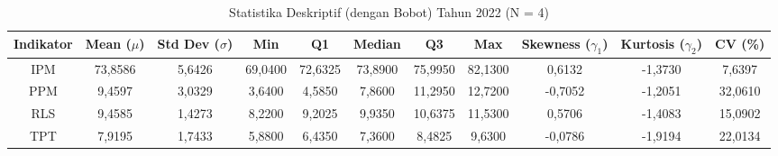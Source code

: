 \begin{table}[H]
\centering
\caption{Statistika Deskriptif (dengan Bobot) Tahun 2022 (N = 4)} \label{tab:sample1desc_2022}
\begin{adjustbox}{max width=\textwidth, max height=0.85\textheight}
\begin{tabular}{|c|c|c|c|c|c|c|c|c|c|c|}
\hline
\textbf{Indikator} & \textbf{Mean ($\mu$)} & \textbf{Std Dev ($\sigma$)} & \textbf{Min} & \textbf{Q1} & \textbf{Median} & \textbf{Q3} & \textbf{Max} & \textbf{Skewness ($\gamma_1$)} & \textbf{Kurtosis ($\gamma_2$)} & \textbf{CV (\%)} \\
\hline
IPM & 73,8586 & 5,6426 & 69,0400 & 72,6325 & 73,8900 & 75,9950 & 82,1300 & 0,6132 & -1,3730 & 7,6397 \\
PPM & 9,4597 & 3,0329 & 3,6400 & 4,5850 & 7,8600 & 11,2950 & 12,7200 & -0,7052 & -1,2051 & 32,0610 \\
RLS & 9,4585 & 1,4273 & 8,2200 & 9,2025 & 9,9350 & 10,6375 & 11,5300 & 0,5706 & -1,4083 & 15,0902 \\
TPT & 7,9195 & 1,7433 & 5,8800 & 6,4350 & 7,3600 & 8,4825 & 9,6300 & -0,0786 & -1,9194 & 22,0134 \\
\hline
\end{tabular}
\end{adjustbox}
\end{table}